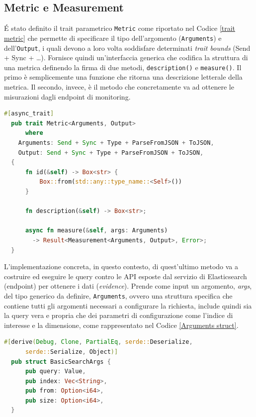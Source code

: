 \subsection{Metric e Measurement}\label{metric trait}
\'E stato definito il trait parametrico \texttt{Metric} come riportato nel Codice \ref{trait metric} che permette di specificare il tipo dell'argomento (\texttt{Arguments}) e dell'\texttt{Output}, i quali devono a loro volta soddisfare determinati \emph{trait bounds} (Send + Sync + \dots). Fornisce quindi un'interfaccia generica che codifica la struttura di una metrica definendo la firma di due metodi, \texttt{description()} e \texttt{measure()}.
Il primo è semplicemente una funzione che ritorna una descrizione letterale della metrica. Il secondo, invece, è il metodo che concretamente va ad ottenere le misurazioni dagli endpoint di monitoring.

\begin{lstlisting}[language=Rust, caption= Metric Trait \label{trait metric}, basicstyle=\ttfamily ]
  #[async_trait]
  pub trait Metric<Arguments, Output>
      where
    Arguments: Send + Sync + Type + ParseFromJSON + ToJSON,
    Output: Send + Sync + Type + ParseFromJSON + ToJSON,
  {
      fn id(&self) -> Box<str> {
          Box::from(std::any::type_name::<Self>())
      }

      fn description(&self) -> Box<str>;

      async fn measure(&self, args: Arguments)
        -> Result<Measurement<Arguments, Output>, Error>;
  }
\end{lstlisting}

L'implementazione concreta, in questo contesto, di quest'ultimo metodo va a costruire ed eseguire le query contro le \gls{API} esposte dal servizio di Elasticsearch (endpoint) per ottenere i dati (\textit{evidence}).
Prende come input un argomento, \textit{args}, del tipo generico da definire, \texttt{Arguments}, ovvero una struttura specifica che contiene tutti gli argomenti necessari a configurare la richiesta, include quindi sia la query vera e propria che dei parametri di configurazione come l'indice di interesse e la dimensione, come rappresentato nel Codice \ref{Arguments struct}.

\begin{lstlisting}[language=Rust, caption= Arguments Struct \label{Arguments struct}, basicstyle=\ttfamily ]
  #[derive(Debug, Clone, PartialEq, serde::Deserialize,
      serde::Serialize, Object)]
  pub struct BasicSearchArgs {
      pub query: Value,
      pub index: Vec<String>,
      pub from: Option<i64>,
      pub size: Option<i64>,
  }
\end{lstlisting}


